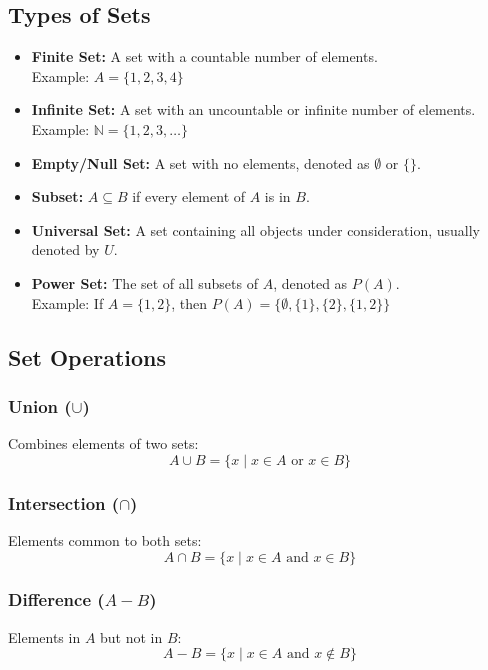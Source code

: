 \subsection{Types of Sets}
\begin{itemize}
    \item \textbf{Finite Set:} A set with a countable number of elements. \\
    Example: \(A = \{1, 2, 3, 4\} \)
    
    \item \textbf{Infinite Set:} A set with an uncountable or infinite number of elements. \\
    Example: \(\mathbb{N} = \{1, 2, 3, \dots\} \)

    \item \textbf{Empty/Null Set:} A set with no elements, denoted as \(\emptyset\) or \(\{\}\).

    \item \textbf{Subset:} \(A \subseteq B\) if every element of \(A\) is in \(B\).

    \item \textbf{Universal Set:} A set containing all objects under consideration, usually denoted by \(U\).

    \item \textbf{Power Set:} The set of all subsets of \(A\), denoted as \(P(A)\). \\
    Example: If \(A = \{1, 2\}\), then \(P(A) = \{\emptyset, \{1\}, \{2\}, \{1, 2\}\} \)
\end{itemize}

\subsection{Set Operations}
\subsubsection{Union (\(\cup\))}
Combines elements of two sets:
\[
    A \cup B = \{x \mid x \in A \text{ or } x \in B\}
\]
\subsubsection{Intersection (\(\cap\))}
Elements common to both sets:
\[
    A \cap B = \{x \mid x \in A \text{ and } x \in B\}
\]
\subsubsection{Difference (\(A - B\))}
Elements in \(A\) but not in \(B\):
\[
    A - B = \{x \mid x \in A \text{ and } x \notin B\}
\]
